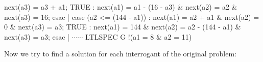 {						  next(a3) = a3 + a1;\newline
 TRUE : next(a1) = a1 - (16 - a3) \&\newline
		next(a2) = a2 \&\newline
		next(a3) = 16; \newline
 \newline
 esac |\newline
 \newline
 case (a2 <= (144 - a1)) : next(a1) = a2 + a1 \&\newline
						   next(a2) = 0 \& \newline
						   next(a3) = a3;\newline
 TRUE : next(a1) = 144 \&\newline
		next(a2) = a2 - (144 - a1) \&\newline
		next(a3) = a3; \newline
 \newline
 esac |\newline
$\cdots \cdots$
\newline
\newline
LTLSPEC G !(a1 = 8 \& a2 = 11)\newline
}
\selectfont
\vspace{3mm}

Now we try to find a solution for each interrogant of the original problem:

